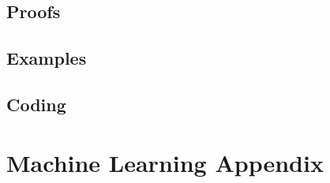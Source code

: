 \documentclass[
fourColumns,
landscape
]{formularyETH/formularyETH}
\begin{document}
\subsection{Proofs}\label{subsec:proofs}
    
\subsection{Examples}\label{subsec:examples}
    
\subsection{Coding}\label{subsec:coding}
    
    
    
    


\newpage
{}
\section*{Machine Learning Appendix}\label{sec:ml_appendix}
  
\newpage
{}

\newpage


\end{document}
